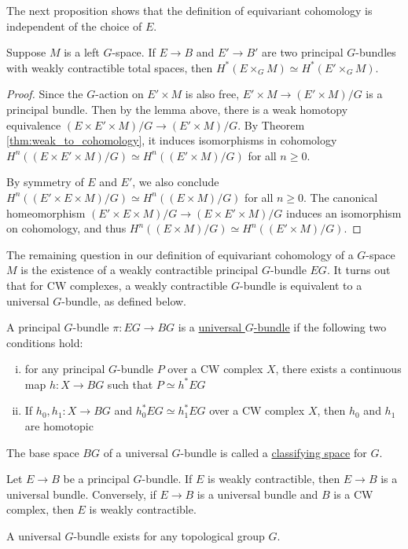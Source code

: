 The next proposition shows that the definition of equivariant cohomology is
independent of the choice of  $E$. 
\begin{prop} %
	Suppose $M$ is a left  $G$-space. If $E\to B$ and  $E'\to B'$ are two principal
	$G$-bundles with weakly contractible total spaces, then $H^*(E\times_G M)
	\simeq H^*(E'\times_G M)$.
\end{prop}
\begin{proof}
	Since the $G$-action on  $E'\times M$ is also free,  $E'\times M \to
	(E'\times M) /G$ is a principal bundle. Then by the lemma above, 
	there is a weak homotopy equivalence 
	$(E\times E' \times M) /G \to (E'\times M) /G$. By 
	Theorem \ref{thm:weak_to_cohomology}, it
	induces isomorphisms in cohomology  $H^n((E\times E'\times M )/G) \simeq
	H^n((E'\times M) /G)$ for all  $n\geq 0$.

	By symmetry of $E$ and  $E'$, we also conclude  $H^n((E'\times E\times M )/G) \simeq
	H^n((E\times M) /G)$ for all  $n\geq 0$. The canonical homeomorphism
	$(E'\times E \times M) /G \to (E\times E'\times M) /G$ induces an
	isomorphism on cohomology, and thus $H^n((E\times M) /G) \simeq
	H^n((E'\times M) /G)$.
\end{proof}

The remaining question in our definition of equivariant cohomology of a
$G$-space $M$ is the existence of a weakly contractible principal $G$-bundle $EG$. 
It turns out that for CW complexes,  
a weakly contractible $G$-bundle is equivalent to a universal $G$-bundle, as
defined below.
\begin{defn}
	A principal $G$-bundle  $\pi:EG\to BG$ is a \underline{universal $G$-bundle} 
	if the following two conditions hold:
	\begin{enumerate}[(i)]
	    \item for any principal $G$-bundle  $P$ over a CW complex $X$, there
			exists a continuous map  $h:X\to BG$ such that  $P \simeq h^*EG$ 
		\item If $h_0,h_1:X\to BG$ and $h_0^*EG \simeq h_1^*EG$ over a CW
			complex $X$, then  $h_0$ and $h_1$ are homotopic
	\end{enumerate}
	The base space $BG$ of a universal  $G$-bundle is called a
	\underline{classifying space} for  $G$.
\end{defn}
\begin{thm} %
	Let $E\to B$ be a principal  $G$-bundle. If  $E$ is weakly contractible,
	then  $E\to B$ is a universal bundle. Conversely, if  $E\to B$ is a
	universal bundle and  $B$ is a CW complex, then  $E$ is weakly contractible.
\end{thm}
\begin{thm} 
	A universal $G$-bundle exists for any topological group  $G$.
\end{thm}

